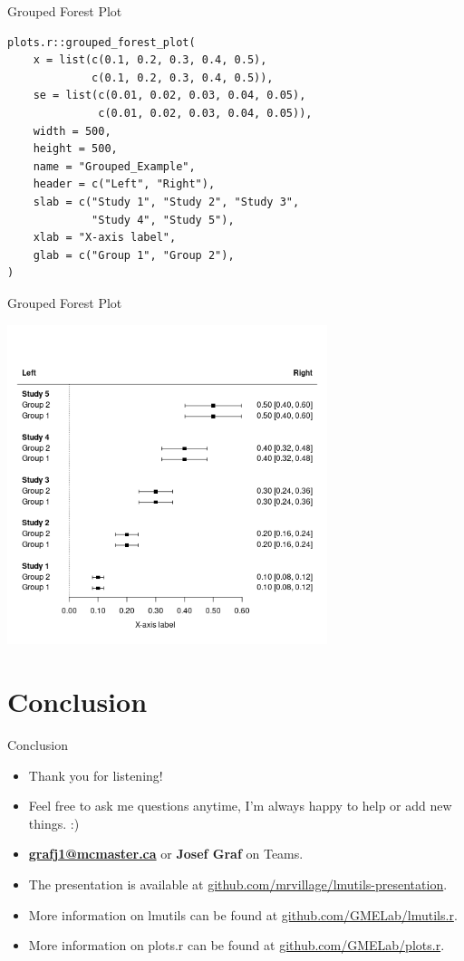 \documentclass[10pt,handout]{beamer}
\begin{document}
\begin{frame}[fragile]{Grouped Forest Plot}
  \begin{verbatim}
plots.r::grouped_forest_plot(
    x = list(c(0.1, 0.2, 0.3, 0.4, 0.5),
             c(0.1, 0.2, 0.3, 0.4, 0.5)),
    se = list(c(0.01, 0.02, 0.03, 0.04, 0.05),
              c(0.01, 0.02, 0.03, 0.04, 0.05)),
    width = 500,
    height = 500,
    name = "Grouped_Example",
    header = c("Left", "Right"),
    slab = c("Study 1", "Study 2", "Study 3",
             "Study 4", "Study 5"),
    xlab = "X-axis label",
    glab = c("Group 1", "Group 2"),
)
\end{verbatim}
\end{frame}

\begin{frame}{Grouped Forest Plot}
  \begin{center}
    \includegraphics[width=0.7\textwidth]{Grouped_Example.png}
  \end{center}
\end{frame}

\section[Conclusion]{Conclusion}

\begin{frame}{Conclusion}
  \begin{itemize}
    \item<1-> Thank you for listening!
    \item<2-> Feel free to ask me questions anytime, I'm always happy to help or add new things. :)
    \item<2-> \hyperlink{mailto:grafj1@mcmaster.ca}{\textbf{grafj1@mcmaster.ca}} or \textbf{Josef Graf} on Teams.
    \item<3-> The presentation is available at \hyperlink{https://github.com/mrvillage/lmutils-presentation}{github.com/mrvillage/lmutils-presentation}.
    \item<3-> More information on lmutils can be found at \hyperlink{https://github.com/GMELab/lmutils.r}{github.com/GMELab/lmutils.r}.
    \item<3-> More information on plots.r can be found at \hyperlink{https://github.com/GMELab/plots.r}{github.com/GMELab/plots.r}.
  \end{itemize}
\end{frame}
\end{document}
